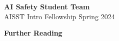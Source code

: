 \documentclass[12pt]{article}
\begin{document}
\thispagestyle{empty} %

\begin{center}

    {\Large \textbf{AI Safety Student Team}}\\
    {\large AISST Intro Fellowship Spring 2024}
\end{center}

\vspace{2em}

\begin{center}
    {\LARGE \textbf{Further Reading}}
\end{center}

\vspace{3em}
\end{document}
